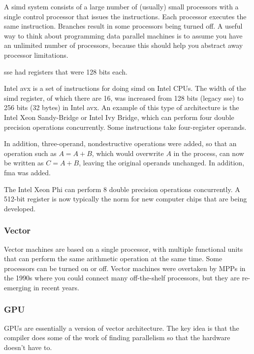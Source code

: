 \documentclass[10pt]{article}
\newcounter{subsubsubsection}[subsubsection]
\begin{document}
\begin{flushleft}
A \gls{simd} system consists of a large number of (usually) small processors with a single control processor that issues the instructions. Each processor executes the same instruction. Branches result in some processors being turned off. A useful way to think about programming data parallel machines is to assume you have an unlimited number of processors, because this should help you abstract away processor limitations. 


\gls{sse} had registers that were 128 bits each. 


Intel \gls{avx} is a set of instructions for doing \gls{simd} on Intel CPUs. The width of the \gls{simd} register, of which there are 16, was increased from 128 bits (legacy \gls{sse}) to 256 bits (32 bytes) in Intel \gls{avx}. An example of this type of architecture is the Intel Xeon Sandy-Bridge or Intel Ivy Bridge, which can perform four double precision operations concurrently. Some instructions take four-register operands. 

In addition, three-operand, nondestructive operations were added, so that an operation such as \(A=A+B\), which would overwrite \(A\) in the process, can now be written as \(C=A+B\), leaving the original operands unchanged. In addition, \gls{fma} was added. 


The Intel Xeon Phi can perform 8 double precision operations concurrently. A 512-bit register is now typically the norm for new computer chips that are being developed.

\subsubsection{Vector}

Vector machines are based on a single processor, with multiple functional units that can perform the same arithmetic operation at the same time. Some processors can be turned on or off. Vector machines were overtaken by MPPs in the 1990s where you could connect many off-the-shelf processors, but they are re-emerging in recent years. 

\subsubsection{GPU}

GPUs are essentially a version of vector architecture. The key idea is that the compiler does some of the work of finding parallelism so that the hardware doesn't have to. 


\end{flushleft}
\end{document}
